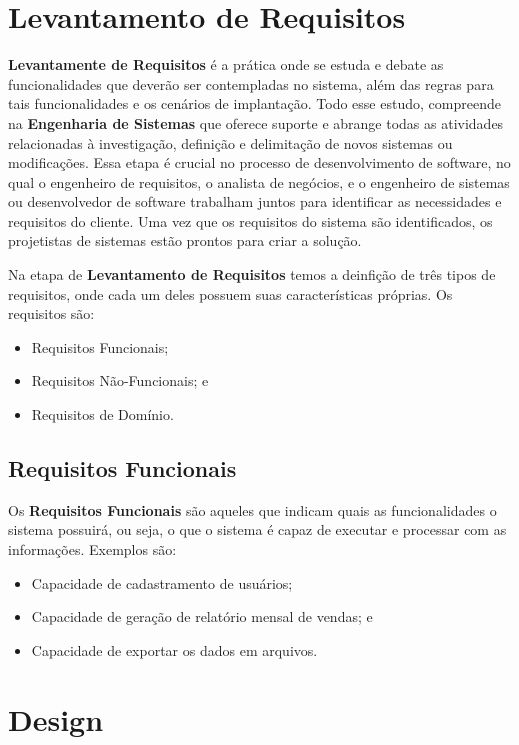 \documentclass[a4paper,12pt]{article}
\begin{document}
\section{Levantamento de Requisitos}
\textbf{Levantamente de Requisitos} é a prática onde se estuda e debate as funcionalidades que deverão ser contempladas no sistema, além das regras para tais funcionalidades e os cenários de implantação. Todo esse estudo, compreende na \textbf{Engenharia de Sistemas} que oferece suporte e abrange todas as atividades relacionadas à investigação, definição e delimitação de novos sistemas ou modificações. Essa etapa é crucial no processo de desenvolvimento de software, no qual o engenheiro de requisitos, o analista de negócios, e o engenheiro de sistemas ou desenvolvedor de software trabalham juntos para identificar as necessidades e requisitos do cliente. Uma vez que os requisitos do sistema são identificados, os projetistas de sistemas estão prontos para criar a solução.

Na etapa de \textbf{Levantamento de Requisitos} temos a deinfição de três tipos de requisitos, onde cada um deles possuem suas características próprias. Os requisitos são:
\begin{itemize}
	\item Requisitos Funcionais;
	\item Requisitos Não-Funcionais; e
	\item Requisitos de Domínio.
\end{itemize}



\subsection{Requisitos Funcionais}
Os \textbf{Requisitos Funcionais} são aqueles que indicam quais as funcionalidades o sistema possuirá, ou seja, o que o sistema é capaz de executar e processar com as informações. Exemplos são:
\begin{itemize}
	\item Capacidade de cadastramento de usuários;
	\item Capacidade de geração de relatório mensal de vendas; e
	\item Capacidade de exportar os dados em arquivos.
\end{itemize}

\section{Design}
\end{document}
